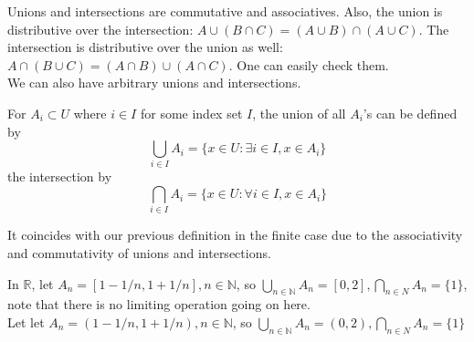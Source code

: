 Unions and intersections are commutative and associatives.
Also, the union is distributive over the intersection: $A\cup (B\cap C)=(A\cup B)\cap (A\cup C)$.
The intersection is distributive over the union as well: $A\cap (B\cup C)=(A\cap B)\cup (A\cap C)$.
One can easily check them.\\
We can also have arbitrary unions and intersections.
\begin{definition}
    For $A_i\subset U$ where $i\in I$ for some index set $I$, the union of all $A_i$'s can be defined by
    $$\bigcup_{i\in I}A_i=\{x\in U:\exists i\in I,x\in A_i\}$$
    the intersection by
    $$\bigcap_{i\in I}A_i=\{x\in U:\forall i\in I,x\in A_i\}$$
\end{definition}
It coincides with our previous definition in the finite case due to the associativity and commutativity of unions and intersections.
\begin{definition}
    In $\mathbb R$, let $A_n=[1-1/n,1+1/n],n\in\mathbb N$, so $\bigcup_{n\in\mathbb N}A_n=[0,2],\bigcap_{n\in N}A_n=\{1\}$, note that there is no limiting operation going on here.\\
    Let let $A_n=(1-1/n,1+1/n),n\in\mathbb N$, so $\bigcup_{n\in\mathbb N}A_n=(0,2),\bigcap_{n\in N}A_n=\{1\}$
\end{definition}

